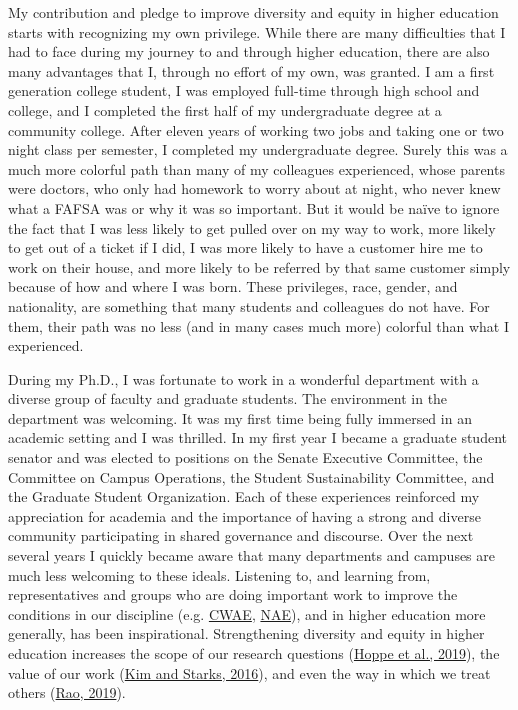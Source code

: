 \documentclass[12pt]{article}
\begin{document}
My contribution and pledge to improve diversity and equity in higher education starts with recognizing my own privilege. While there are many difficulties that I had to face during my journey to and through higher education, there are also many advantages that I, through no effort of my own, was granted. I am a first generation college student, I was employed full-time through high school and college, and I completed the first half of my undergraduate degree at a community college. After eleven years of working two jobs and taking one or two night class per semester, I completed my undergraduate degree. Surely this was a much more colorful path than many of my colleagues experienced, whose parents were doctors, who only had homework to worry about at night, who never knew what a FAFSA was or why it was so important. But it would be na\"ive to ignore the fact that I was less likely to get pulled over on my way to work, more likely to get out of a ticket if I did, I was more likely to have a customer hire me to work on their house, and more likely to be referred by that same customer simply because of how and where I was born. These privileges, race, gender, and nationality, are something that many students and colleagues do not have. For them, their path was no less (and in many cases much more) colorful than what I experienced.

During my Ph.D., I was fortunate to work in a wonderful department with a diverse group of faculty and graduate students. The environment in the department was welcoming. It was my first time being fully immersed in an academic setting and I was thrilled. In my first year I became a graduate student senator and was elected to positions on the Senate Executive Committee, the Committee on Campus Operations, the Student Sustainability Committee, and the Graduate Student Organization. Each of these experiences reinforced my appreciation for academia and the importance of having a strong and diverse community participating in shared governance and discourse. Over the next several years I quickly became aware that many departments and campuses are much less welcoming to these ideals. Listening to, and learning from, representatives and groups who are doing important work to improve the conditions in our discipline (e.g. \href{https://www.aaea.org/membership/sections/cwae}{CWAE}, \href{https://www.neaecon.org/}{NAE}), and in higher education more generally, has been inspirational. Strengthening diversity and equity in higher education increases the scope of our research questions (\href{https://advances.sciencemag.org/content/5/10/eaaw7238}{Hoppe et al., 2019}), the value of our work  (\href{https://www.aeaweb.org/articles?id=10.1257/aer.p20161032}{Kim and Starks, 2016}), and even the way in which we treat others (\href{https://www.aeaweb.org/articles?id=10.1257/aer.20180044}{Rao, 2019}).
\end{document}

